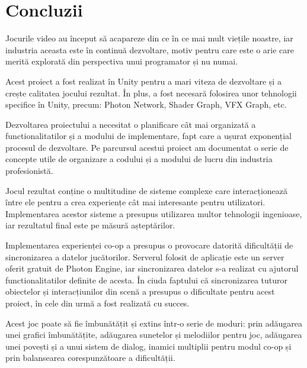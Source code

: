 \documentclass[12pt, a4paper]{article}
\begin{document}
	
	
	
	
	\section{Concluzii}
	
	Jocurile video au început să acapareze din ce în ce mai mult viețile noastre, iar industria aceasta este în continuă dezvoltare, motiv pentru care este o arie care merită explorată din perspectiva unui programator și nu numai.
	\newline
	
	Acest proiect a fost realizat în Unity pentru a mari viteza de dezvoltare și a crește calitatea jocului rezultat. În plus, a fost necesară folosirea unor tehnologii specifice în Unity, precum: Photon Network, Shader Graph, VFX Graph, etc.
	\newline
	
	Dezvoltarea proiectului a necesitat o planificare cât mai organizată a functionalitatilor și a modului de implementare, fapt care a ușurat exponențial procesul de dezvoltare. Pe parcursul acestui proiect am documentat o serie de concepte utile de organizare a codului și a modului de lucru din industria profesionistă.
	\newline
	
	Jocul rezultat conține o multitudine de sisteme complexe care interacționează între ele pentru a crea experiențe cât mai interesante pentru utilizatori. Implementarea acestor sisteme a presupus utilizarea multor tehnologii ingenioase, iar rezultatul final este pe măsură așteptărilor.
	\newline
	
	Implementarea experienței co-op a presupus o provocare datorită dificultății de sincronizarea a datelor jucătorilor. Serverul folosit de aplicație este un server oferit gratuit de Photon Engine, iar sincronizarea datelor s-a realizat cu ajutorul functionalitatilor definite de acesta. În ciuda faptului că sincronizarea tuturor obiectelor și interacțiunilor din scenă a presupus o dificultate pentru acest proiect, în cele din urmă a fost realizată cu succes.
	\newline
	
	Acest joc poate să fie îmbunătățit și extins într-o serie de moduri: prin adăugarea unei grafici îmbunătățite, adăugarea sunetelor și melodiilor pentru joc, adăugarea unei povești și a unui sistem de dialog, inamici multiplii pentru modul co-op și prin balansearea corespunzătoare a dificultății.
	\newline
	
\end{document}
